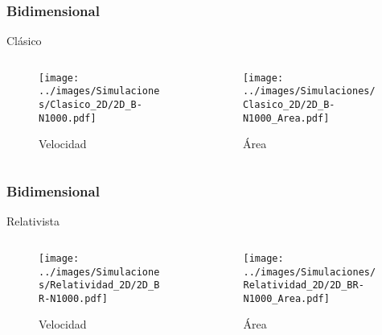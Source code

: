 \documentclass{beamer}
\begin{document}
\begin{frame}
    \frametitle[prueb1]{Bidimensional}{Clásico}
    \centering
    \vspace{-0.5cm}
    \begin{columns}
        \hspace{-0.7cm}
        \begin{column}{0.5\textwidth}
            \begin{figure}
                \centering
                \texttt{[image: ../images/Simulaciones/Clasico\_2D/2D\_B-N1000.pdf]}
                \caption{Velocidad}
            \end{figure}         
        \end{column}
        \begin{column}{0.5\textwidth}
            \begin{figure}
                \centering 
                \texttt{[image: ../images/Simulaciones/Clasico\_2D/2D\_B-N1000\_Area.pdf]}
                \caption{Área}
            \end{figure}
        \end{column}
    \end{columns}
\end{frame}

\begin{frame}
    \frametitle[prueb1]{Bidimensional}{Relativista}
    \centering
    \vspace{-0.5cm}
    \begin{columns}
        \hspace{-0.7cm}
        \begin{column}{0.5\textwidth}
            \begin{figure}
                \centering
                \texttt{[image: ../images/Simulaciones/Relatividad\_2D/2D\_BR-N1000.pdf]}
                \caption{Velocidad}
            \end{figure}         
        \end{column}
        \begin{column}{0.5\textwidth}
            \begin{figure}
                \centering 
                \texttt{[image: ../images/Simulaciones/Relatividad\_2D/2D\_BR-N1000\_Area.pdf]}
                \caption{Área}
            \end{figure}
        \end{column}
    \end{columns}
\end{frame}
\end{document}
